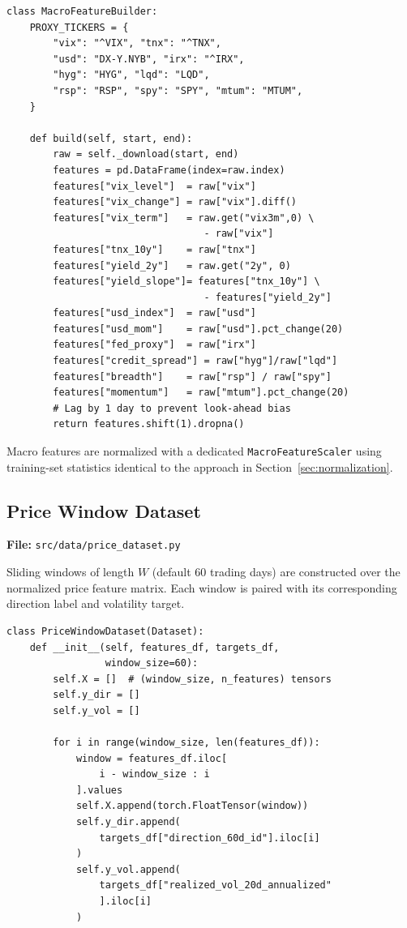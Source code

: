 \documentclass[12pt, a4paper]{article}
\begin{document}
\begin{lstlisting}[caption={Macro feature extraction (excerpt)}]
class MacroFeatureBuilder:
    PROXY_TICKERS = {
        "vix": "^VIX", "tnx": "^TNX",
        "usd": "DX-Y.NYB", "irx": "^IRX",
        "hyg": "HYG", "lqd": "LQD",
        "rsp": "RSP", "spy": "SPY", "mtum": "MTUM",
    }
    
    def build(self, start, end):
        raw = self._download(start, end)
        features = pd.DataFrame(index=raw.index)
        features["vix_level"]  = raw["vix"]
        features["vix_change"] = raw["vix"].diff()
        features["vix_term"]   = raw.get("vix3m",0) \
                                  - raw["vix"]
        features["tnx_10y"]    = raw["tnx"]
        features["yield_2y"]   = raw.get("2y", 0)
        features["yield_slope"]= features["tnx_10y"] \
                                  - features["yield_2y"]
        features["usd_index"]  = raw["usd"]
        features["usd_mom"]    = raw["usd"].pct_change(20)
        features["fed_proxy"]  = raw["irx"]
        features["credit_spread"] = raw["hyg"]/raw["lqd"]
        features["breadth"]    = raw["rsp"] / raw["spy"]
        features["momentum"]   = raw["mtum"].pct_change(20)
        # Lag by 1 day to prevent look-ahead bias
        return features.shift(1).dropna()
\end{lstlisting}

Macro features are normalized with a dedicated \texttt{MacroFeatureScaler} using training-set statistics identical to the approach in Section~\ref{sec:normalization}.


\subsection{Price Window Dataset}
\label{sec:price-dataset}

\noindent\textbf{File:} \texttt{src/data/price\_dataset.py}

Sliding windows of length $W$ (default 60 trading days) are constructed over the normalized price feature matrix.  Each window is paired with its corresponding direction label and volatility target.

\begin{lstlisting}[caption={Sliding window construction}]
class PriceWindowDataset(Dataset):
    def __init__(self, features_df, targets_df,
                 window_size=60):
        self.X = []  # (window_size, n_features) tensors
        self.y_dir = []
        self.y_vol = []
        
        for i in range(window_size, len(features_df)):
            window = features_df.iloc[
                i - window_size : i
            ].values
            self.X.append(torch.FloatTensor(window))
            self.y_dir.append(
                targets_df["direction_60d_id"].iloc[i]
            )
            self.y_vol.append(
                targets_df["realized_vol_20d_annualized"
                ].iloc[i]
            )
\end{lstlisting}
\end{document}
